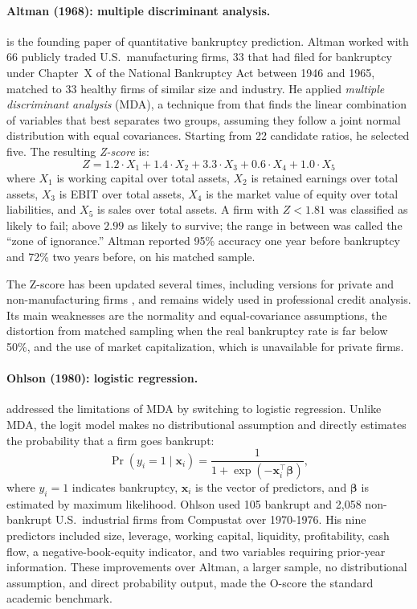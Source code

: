 \documentclass[12pt,a4paper]{article}
\begin{document}
\paragraph{Altman (1968): multiple discriminant analysis.}
\cite{altman1968} is the founding paper of quantitative bankruptcy prediction.
Altman worked with 66 publicly traded U.S.\ manufacturing firms, 33 that had
filed for bankruptcy under Chapter~X of the National Bankruptcy Act between
1946 and 1965, matched to 33 healthy firms of similar size and industry.
He applied \textit{multiple discriminant analysis} (MDA), a technique from
\cite{fisher1936} that finds the linear combination of variables that best
separates two groups, assuming they follow a joint normal distribution with
equal covariances. Starting from 22 candidate ratios, he selected five. The resulting \textit{Z-score} is:
\begin{equation}
Z = 1.2 \cdot X_1 + 1.4 \cdot X_2 + 3.3 \cdot X_3 + 0.6 \cdot X_4 + 1.0 \cdot X_5
\label{eq:altman}
\end{equation}
where $X_1$ is working capital over total assets, $X_2$ is retained earnings
over total assets, $X_3$ is EBIT over total assets, $X_4$ is the market value
of equity over total liabilities, and $X_5$ is sales over total assets. A firm
with $Z < 1.81$ was classified as likely to fail; above $2.99$ as likely to
survive; the range in between was called the ``zone of ignorance.'' Altman
reported 95\% accuracy one year before bankruptcy and 72\% two years before,
on his matched sample.

The Z-score has been updated several times, including versions for private and
non-manufacturing firms \citep{altman2000}, and remains widely used in
professional credit analysis. Its main weaknesses are the normality and equal-covariance assumptions,
the distortion from matched sampling when the real bankruptcy rate is far
below 50\%, and the use of market capitalization, which is unavailable
for private firms.

\paragraph{Ohlson (1980): logistic regression.}
\cite{ohlson1980} addressed the limitations of MDA by switching to logistic
regression. Unlike MDA, the logit model makes no distributional assumption
and directly estimates the probability that a firm goes bankrupt:
\begin{equation}
\Pr(y_i = 1 \mid \mathbf{x}_i) =
\frac{1}{1 + \exp(-\mathbf{x}_i^\top \boldsymbol{\beta})},
\label{eq:logit}
\end{equation}
where $y_i = 1$ indicates bankruptcy, $\mathbf{x}_i$ is the vector of
predictors, and $\boldsymbol{\beta}$ is estimated by maximum likelihood.
Ohlson used 105 bankrupt and 2,058 non-bankrupt U.S.\ industrial firms from
Compustat over 1970-1976. His nine predictors included size, leverage,
working capital, liquidity, profitability, cash flow, a negative-book-equity
indicator, and two variables requiring prior-year information. These improvements over Altman, a larger sample, no distributional assumption,
and direct probability output, made the O-score the standard academic benchmark.
\end{document}
